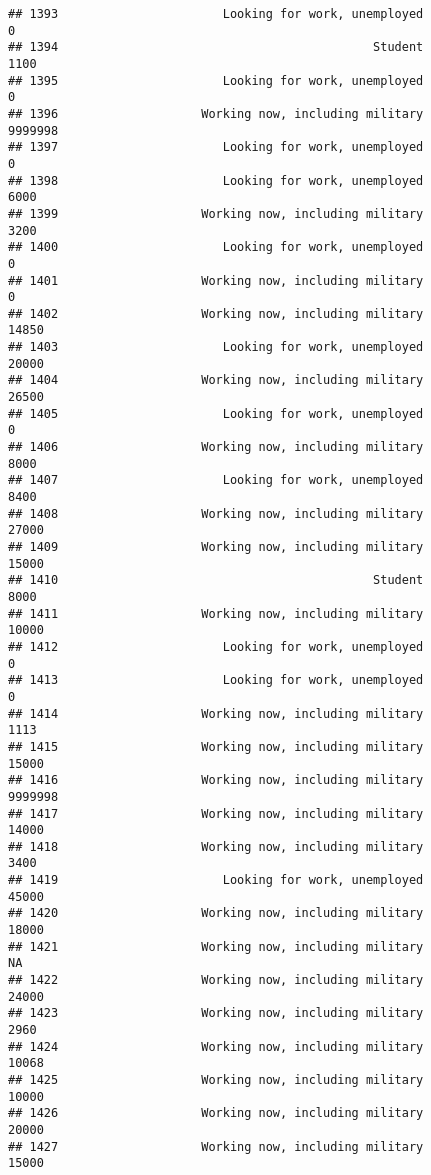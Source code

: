 \documentclass[]{book}
\theoremstyle{definition}
\theoremstyle{definition}
\theoremstyle{remark}
\begin{document}
\begin{verbatim}
## 1393                       Looking for work, unemployed               0
## 1394                                            Student            1100
## 1395                       Looking for work, unemployed               0
## 1396                    Working now, including military         9999998
## 1397                       Looking for work, unemployed               0
## 1398                       Looking for work, unemployed            6000
## 1399                    Working now, including military            3200
## 1400                       Looking for work, unemployed               0
## 1401                    Working now, including military               0
## 1402                    Working now, including military           14850
## 1403                       Looking for work, unemployed           20000
## 1404                    Working now, including military           26500
## 1405                       Looking for work, unemployed               0
## 1406                    Working now, including military            8000
## 1407                       Looking for work, unemployed            8400
## 1408                    Working now, including military           27000
## 1409                    Working now, including military           15000
## 1410                                            Student            8000
## 1411                    Working now, including military           10000
## 1412                       Looking for work, unemployed               0
## 1413                       Looking for work, unemployed               0
## 1414                    Working now, including military            1113
## 1415                    Working now, including military           15000
## 1416                    Working now, including military         9999998
## 1417                    Working now, including military           14000
## 1418                    Working now, including military            3400
## 1419                       Looking for work, unemployed           45000
## 1420                    Working now, including military           18000
## 1421                    Working now, including military              NA
## 1422                    Working now, including military           24000
## 1423                    Working now, including military            2960
## 1424                    Working now, including military           10068
## 1425                    Working now, including military           10000
## 1426                    Working now, including military           20000
## 1427                    Working now, including military           15000

\end{verbatim}
\end{document}
